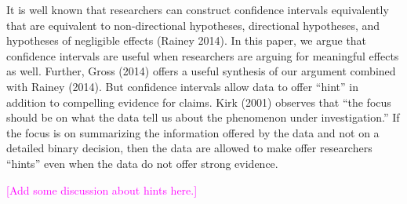 \documentclass[12pt]{article}
\newcommand{\carlisle}[1]{\textcolor{magenta}{#1}}
\begin{document}
It is well known that researchers can construct confidence intervals equivalently that are equivalent to non-directional hypotheses, directional hypotheses, and hypotheses of negligible effects (Rainey 2014). In this paper, we argue that confidence intervals are useful when researchers are arguing for meaningful effects as well. Further, Gross (2014) offers a useful synthesis of our argument combined with Rainey (2014). But confidence intervals allow data to offer ``hint'' in addition to compelling evidence for claims. Kirk (2001) observes that ``the focus should be on what the data tell us about the phenomenon under investigation.'' If the focus is on summarizing the information offered by the data and not on a detailed binary decision, then the data are allowed to make offer researchers ``hints'' even when the data do not offer strong evidence.

\carlisle{[Add some discussion about hints here.]}



%
%
\end{document}
